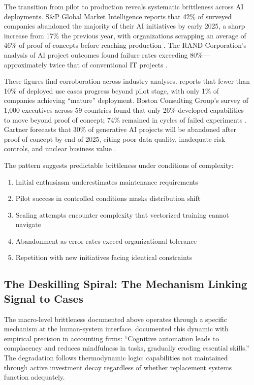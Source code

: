 The transition from pilot to production reveals systematic brittleness across AI deployments. S\&P Global Market Intelligence reports that 42\% of surveyed companies abandoned the majority of their AI initiatives by early 2025, a sharp increase from 17\% the previous year, with organizations scrapping an average of 46\% of proof-of-concepts before reaching production \citep{spglobal2025}. The RAND Corporation's analysis of AI project outcomes found failure rates exceeding 80\%---approximately twice that of conventional IT projects \citep{rand2024}.

These figures find corroboration across industry analyses. \citet{mckinsey2025} reports that fewer than 10\% of deployed use cases progress beyond pilot stage, with only 1\% of companies achieving ``mature'' deployment. Boston Consulting Group's survey of 1,000 executives across 59 countries found that only 26\% developed capabilities to move beyond proof of concept; 74\% remained in cycles of failed experiments \citep{bcg2024}. Gartner forecasts that 30\% of generative AI projects will be abandoned after proof of concept by end of 2025, citing poor data quality, inadequate risk controls, and unclear business value \citep{gartner2024ai}.

The pattern suggests predictable brittleness under conditions of complexity:

\begin{enumerate}
\item Initial enthusiasm underestimates maintenance requirements
\item Pilot success in controlled conditions masks distribution shift
\item Scaling attempts encounter complexity that vectorized training cannot navigate
\item Abandonment as error rates exceed organizational tolerance
\item Repetition with new initiatives facing identical constraints
\end{enumerate}

\subsection{The Deskilling Spiral: The Mechanism Linking Signal to Cases}

The macro-level brittleness documented above operates through a specific mechanism at the human-system interface. \citet{rintakahila2023} documented this dynamic with empirical precision in accounting firms: ``Cognitive automation leads to complacency and reduces mindfulness in tasks, gradually eroding essential skills.'' The degradation follows thermodynamic logic: capabilities not maintained through active investment decay regardless of whether replacement systems function adequately.

